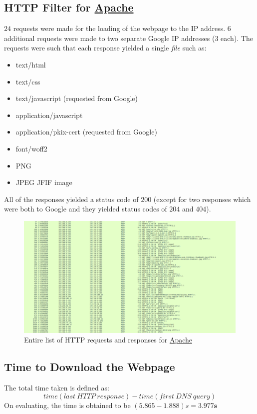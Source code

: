 \documentclass[11pt]{article}
\begin{document}
\subsection{HTTP Filter for \href{http://apache.org}{Apache}}
$24$ requests were made for the loading of the webpage to the IP address. $6$ additional requests were made to two separate Google IP addresses ($3$ each). The requests were such that each response yielded a single \textit{file} such as:
\begin{itemize}
    \item text/html
    \item text/css
    \item text/javascript (requested from Google)
    \item application/javascript
    \item application/pkix-cert (requested from Google)
    \item font/woff2
    \item PNG
    \item JPEG JFIF image
\end{itemize}
All of the responses yielded a status code of $200$ (except for two responses which were both to Google and they yielded status codes of $204$ and $404$).
\begin{figure}[H]
    \centering
    \includegraphics[width=\textwidth]{apache_http}
    \caption{Entire list of HTTP requests and responses for \href{http://apache.org}{Apache}}
\end{figure}

\subsection{Time to Download the Webpage}
The total time taken is defined as:
\[{time}(last\ HTTP\ response) - {time}(first\ DNS\ query)\]
On evaluating, the time is obtained to be $(5.865-1.888)s=\mathbf{3.977s}$
\end{document}
